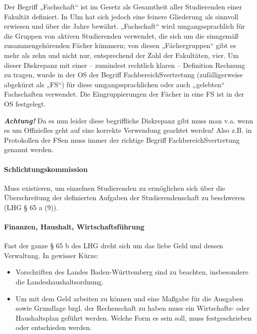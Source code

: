 \documentclass[
10pt,
a4paper,
twoside,								%
titlepage=false,							%
draft=false								%
]{scrartcl}
\begin{document}
Der Begriff „Fachschaft“ ist im Gesetz als Gesamtheit aller Studierenden einer Fakultät definiert. In Ulm hat sich jedoch eine feinere Gliederung als sinnvoll erwiesen und über die Jahre bewährt. „Fachschaft“ wird umgangssprachlich für die Gruppen von aktiven Studierenden verwendet, die sich um die sinngemäß zusammengehörenden Fächer kümmern; von diesen „Fächergruppen“ gibt es mehr als zehn und nicht nur, entsprechend der Zahl der Fakultäten, vier. Um dieser Diskrepanz mit einer – zumindest rechtlich klaren – Definition Rechnung zu tragen, wurde in der OS der Begriff FachbereichSvertretung (zufälligerweise abgekürzt als „FS“) für diese umgangssprachlichen oder auch „gelebten“ Fachschaften verwendet. Die Eingruppierungen der Fächer in eine FS ist in der OS festgelegt.

\textbf{\emph{Achtung!}} Da es nun leider diese begriffliche Diskrepanz gibt muss man v.a. wenn es um Offizielles geht auf eine korrekte Verwendung geachtet werden! Also z.B. in Protokollen der FSen muss immer der richtige Begriff FachbereichSvertretung genannt werden.


\paragraph{Schlichtungskommission}

Muss existieren, um einzelnen Studierenden zu ermöglichen sich über die Überschreitung der definierten Aufgaben der Studierendenschaft zu beschweren (LHG § 65 a (9)).


\paragraph{Finanzen, Haushalt, Wirtschaftsführung\label{Glossar:Finanzen, Haushalt, Wirtschaftsführung}}

Fast der ganze § 65 b des LHG dreht sich um das liebe Geld und dessen Verwaltung. In gewisser Kürze:
\begin{itemize}
	\item Vorschriften des Landes Baden-Württemberg sind zu beachten, insbesondere die Landeshaushaltsordnung.
	\item Um mit dem Geld arbeiten zu können und eine Maßgabe für die Ausgaben sowie Grundlage bzgl. der Rechenschaft zu haben muss ein Wirtschafts- oder Haushaltsplan geführt werden. Welche Form es sein soll, muss festgeschrieben oder entschieden werden.
\end{itemize}
\end{document}
